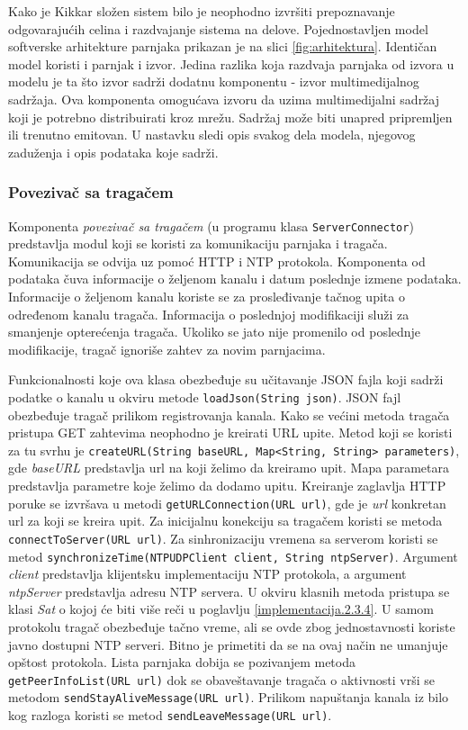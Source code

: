 \documentclass[12pt,oneside]{memoir}
\begin{document}
Kako je Kikkar složen sistem bilo je neophodno izvršiti prepoznavanje odgovarajućih celina i razdvajanje sistema na delove. Pojednostavljen model softverske arhitekture parnjaka prikazan je na slici \ref{fig:arhitektura}. Identičan model koristi i parnjak i izvor. Jedina razlika koja razdvaja parnjaka od izvora u modelu je ta što izvor sadrži dodatnu komponentu - izvor multimedijalnog sadržaja. Ova komponenta omogućava izvoru da uzima multimedijalni sadržaj koji je potrebno distribuirati kroz mrežu. Sadržaj može biti unapred pripremljen ili trenutno emitovan. U nastavku sledi opis svakog dela modela, njegovog zaduženja i opis podataka koje sadrži.


\subsubsection{Povezivač sa tragačem}
\label{implementacija.2.3.1}

Komponenta \textit{povezivač sa tragačem} (u programu klasa \texttt{ServerConnector}) predstavlja modul koji se koristi za komunikaciju parnjaka i tragača. Komunikacija se odvija uz pomoć HTTP i NTP protokola. Komponenta od podataka čuva informacije o željenom kanalu i datum poslednje izmene podataka. Informacije o željenom kanalu koriste se za prosleđivanje tačnog upita o određenom kanalu tragača. Informacija o poslednjoj modifikaciji služi za smanjenje opterećenja tragača. Ukoliko se jato nije promenilo od poslednje modifikacije, tragač ignoriše zahtev za novim parnjacima. 

Funkcionalnosti koje ova klasa obezbeđuje su učitavanje JSON fajla koji sadrži podatke o kanalu u okviru metode \texttt{loadJson(String json)}. JSON fajl obezbeđuje tragač prilikom registrovanja kanala. Kako se većini metoda tragača pristupa GET zahtevima neophodno je kreirati URL upite. Metod koji se koristi za tu svrhu je \texttt{createURL(String baseURL, Map<String, String> parameters)}, gde \textit{baseURL} predstavlja url na koji želimo da kreiramo upit. Mapa parametara predstavlja parametre koje želimo da dodamo upitu. Kreiranje zaglavlja HTTP poruke se izvršava u metodi \texttt{getURLConnection(URL url)}, gde je \textit{url} konkretan url za koji se kreira upit. Za inicijalnu konekciju sa tragačem koristi se metoda \texttt{connectToServer(URL url)}. Za sinhronizaciju vremena sa serverom koristi se metod \texttt{synchronizeTime(NTPUDPClient client, String ntpServer)}. Argument \textit{client} predstavlja klijentsku implementaciju NTP protokola, a argument \textit{ntpServer} predstavlja adresu NTP servera. U okviru klasnih metoda pristupa se klasi \textit{Sat} o kojoj će biti više reči u poglavlju \ref{implementacija.2.3.4}. U samom protokolu tragač obezbeđuje tačno vreme, ali se ovde zbog jednostavnosti koriste javno dostupni NTP serveri. Bitno je primetiti da se na ovaj način ne umanjuje opštost protokola. Lista parnjaka dobija se pozivanjem metoda \texttt{getPeerInfoList(URL url)} dok se obaveštavanje tragača o aktivnosti vrši se metodom \texttt{sendStayAliveMessage(URL url)}. Prilikom napuštanja kanala iz bilo kog razloga koristi se metod \texttt{sendLeaveMessage(URL url)}.  
\end{document}
